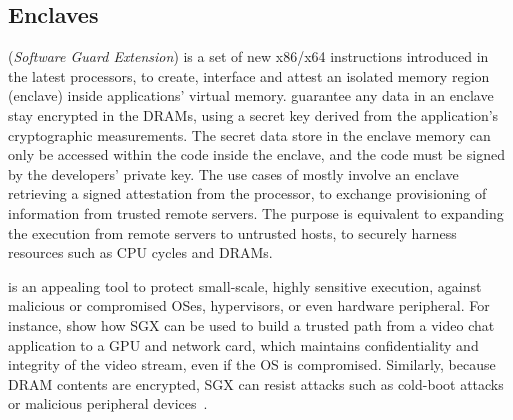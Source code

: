 
\subsection{\intel{} \sgx{} Enclaves}
\label{sec:graphene:background:sgx}


\intel{} \sgx{} ({\it Software Guard Extension})
is a set of new x86/x64 instructions
introduced in the latest \intel{} \skylake{} processors,
to create, interface and attest
an isolated memory region (enclave) inside applications' virtual memory.
\sgx{} guarantee any data in an enclave
stay encrypted in the DRAMs, using a secret key derived from
the application's cryptographic measurements.
The secret data store in the enclave memory
can only be accessed within the code inside the enclave,
and the code must be signed by the developers' private key.
The use cases of \sgx{} mostly involve an enclave
retrieving a signed attestation from the \intel{} processor,
to exchange provisioning of information from trusted remote servers.
The purpose is equivalent to
expanding the execution from remote servers
to untrusted hosts,
to securely harness resources such as CPU cycles and DRAMs.

\sgx{} is an appealing tool to protect small-scale, highly sensitive execution, 
against malicious or compromised OSes, hypervisors, or even hardware peripheral.
For instance, \cite{hoekstra13sgx} show how SGX can be used
to build a trusted path from a video chat application to a GPU and network card, which maintains confidentiality and integrity of the
video stream, even if the OS is compromised.
Similarly, because DRAM contents are encrypted, SGX can resist attacks such as cold-boot attacks~\citep{halderman09coldboot} or 
malicious peripheral devices~\citep{hudson15thunderstrike}.

